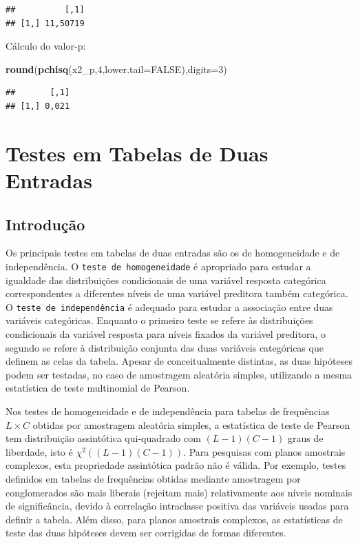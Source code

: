 \documentclass[]{book}
\newenvironment{Shaded}{\begin{snugshade}}{\end{snugshade}}
\newcommand{\KeywordTok}[1]{\textcolor[rgb]{0.13,0.29,0.53}{\textbf{#1}}}
\newcommand{\DataTypeTok}[1]{\textcolor[rgb]{0.13,0.29,0.53}{#1}}
\newcommand{\DecValTok}[1]{\textcolor[rgb]{0.00,0.00,0.81}{#1}}
\newcommand{\OtherTok}[1]{\textcolor[rgb]{0.56,0.35,0.01}{#1}}
\newcommand{\NormalTok}[1]{#1}
\theoremstyle{definition}
\theoremstyle{definition}
\theoremstyle{definition}
\theoremstyle{remark}
\begin{document}
\begin{verbatim}
##          [,1]
## [1,] 11,50719
\end{verbatim}

Cálculo do valor-p:

\begin{Shaded}
\begin{Highlighting}[]
\KeywordTok{round}\NormalTok{(}\KeywordTok{pchisq}\NormalTok{(x2_p,}\DecValTok{4}\NormalTok{,}\DataTypeTok{lower.tail=}\OtherTok{FALSE}\NormalTok{),}\DataTypeTok{digits=}\DecValTok{3}\NormalTok{)}
\end{Highlighting}
\end{Shaded}

\begin{verbatim}
##       [,1]
## [1,] 0,021
\end{verbatim}

\chapter{Testes em Tabelas de Duas Entradas}\label{testetab2}

\section{Introdução}\label{introducao-2}

Os principais testes em tabelas de duas entradas são os de homogeneidade
e de independência. O \texttt{teste\ de\ homogeneidade} é apropriado
para estudar a igualdade das distribuições condicionais de uma variável
resposta categórica correspondentes a diferentes níveis de uma variável
preditora também categórica. O \texttt{teste\ de\ independência} é
adequado para estudar a associação entre duas variáveis categóricas.
Enquanto o primeiro teste se refere às distribuições condicionais da
variável resposta para níveis fixados da variável preditora, o segundo
se refere à distribuição conjunta das duas variáveis categóricas que
definem as celas da tabela. Apesar de conceitualmente distintas, as duas
hipóteses podem ser testadas, no caso de amostragem aleatória simples,
utilizando a mesma estatística de teste multinomial de Pearson.

Nos testes de homogeneidade e de independência para tabelas de
frequências \(L\times C\) obtidas por amostragem aleatória simples, a
estatística de teste de Pearson tem distribuição assintótica
qui-quadrado com \((L-1)(C-1)\) graus de liberdade, isto é
\(\chi ^{2}\left( (L-1)(C-1)\right)\). Para pesquisas com planos
amostrais complexos, esta propriedade assintótica padrão não é válida.
Por exemplo, testes definidos em tabelas de frequências obtidas mediante
amostragem por conglomerados são mais liberais (rejeitam mais)
relativamente aos níveis nominais de significância, devido à correlação
intraclasse positiva das variáveis usadas para definir a tabela. Além
disso, para planos amostrais complexos, as estatísticas de teste das
duas hipóteses devem ser corrigidas de formas diferentes.
\end{document}
